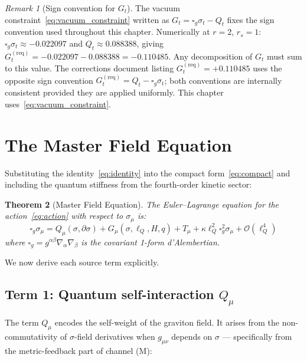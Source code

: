 \documentclass[11pt,a4paper]{article}
\theoremstyle{plain}
\newtheorem{theorem}{Theorem}[section]
\theoremstyle{definition}
\theoremstyle{remark}
\newtheorem{remark}[theorem]{Remark}
\newcommand{\sigt}{\sigma_t}
\newcommand{\lQ}{\ell_Q}
\newcommand{\boxg}{\square_g}
\begin{document}
\begin{remark}[Sign convention for $G_t$]
\label{rem:sign_convention}
The vacuum constraint~\eqref{eq:vacuum_constraint} written as $G_t = \boxg\sigt - Q_t$
fixes the sign convention used throughout this chapter.  Numerically at $r=2$, $r_s=1$:
$\boxg\sigt \approx -0.022097$ and $Q_t \approx 0.088388$, giving
$G_t^{(\mathrm{req})} = -0.022097 - 0.088388 = -0.110485$.
Any decomposition of $G_t$ must sum to this value.  The corrections document
listing $G_t^{(\mathrm{req})} = +0.110485$ uses the opposite sign convention
$G_t^{(\mathrm{req})} = Q_t - \boxg\sigt$; both conventions are internally
consistent provided they are applied uniformly.  This chapter uses~\eqref{eq:vacuum_constraint}.
\end{remark}

\section{The Master Field Equation}
\label{sec:master}

Substituting the identity~\eqref{eq:identity} into the compact form~\eqref{eq:compact}
and including the quantum stiffness from the fourth-order kinetic sector:

\begin{theorem}[Master Field Equation]
\label{thm:master}
The Euler--Lagrange equation for the action~\eqref{eq:action} with respect
to $\sigma_\mu$ is:
\begin{equation}
  \boxed{\boxg\sigma_\mu
    = Q_\mu(\sigma,\partial\sigma)
    + G_\mu(\sigma,\lQ,H,q)
    + T_\mu
    + \kappa\lQ^2\boxg^2\sigma_\mu
    + \mathcal{O}(\lQ^4)}
  \label{eq:master}
\end{equation}
where $\boxg = g^{\alpha\beta}\nabla_\alpha\nabla_\beta$ is the covariant
1-form d'Alembertian.
\end{theorem}

We now derive each source term explicitly.

\subsection{Term 1: Quantum self-interaction $Q_\mu$}
\label{sec:Qmu}

The term $Q_\mu$ encodes the self-weight of the graviton field.  It arises from the
non-commutativity of $\sigma$-field derivatives when $g_{\mu\nu}$ depends on $\sigma$
--- specifically from the metric-feedback part of channel (M):
\end{document}
